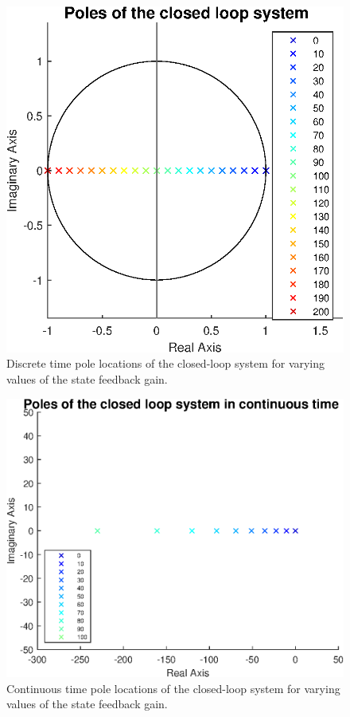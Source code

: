 \documentclass[a4paper,kul]{kulakarticle} %
\begin{document}
\begin{figure}[htp!]
	\centering
	\includegraphics[width=0.5\linewidth]{poles.eps}
	\caption{Discrete time pole locations of the closed-loop system for varying values of the state feedback gain.}
	\label{fig:poles}
\end{figure}

\begin{figure}[htp!]
	\centering
	\includegraphics[width=0.55\linewidth]{poles_cont.eps}
	\caption{Continuous time pole locations of the closed-loop system for varying values of the state feedback gain.} 
	\label{fig:poles cont}
\end{figure}

%
\end{document}
